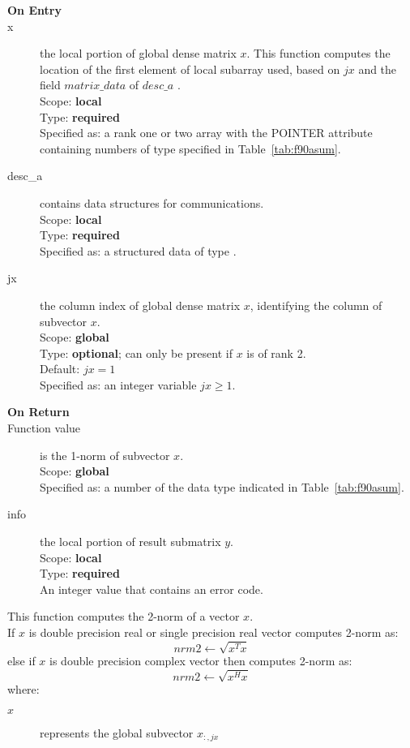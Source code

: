 \begin{description}
\item[\bf On Entry]
\item[x] the local portion of global dense matrix
$x$. This function computes the location of the first element of 
local subarray used, based on $jx$ and the field $matrix\_data$ of $desc\_a$ . \\
Scope: {\bf local} \\
Type: {\bf required} \\
Specified as: a rank one or two array with the POINTER attribute
containing numbers of type specified in
Table~\ref{tab:f90asum}.
\item[desc\_a] contains data structures for communications.\\
Scope: {\bf local} \\
Type: {\bf required}\\
Specified as: a structured data of type \descdata.
\item[jx]  the column index of global dense matrix $x$,
identifying the column of subvector $x$.\\
Scope: {\bf global} \\
Type: {\bf optional}; can only be present if $x$ is of rank 2.\\	
Default: $jx = 1$\\	
Specified as: an integer variable $jx\ge 1$. 

\item[\bf On Return] 
\item[Function value] is the 1-norm of subvector $x$.\\
Scope: {\bf global} \\
Specified as: a number of the data type indicated in Table~\ref{tab:f90asum}.
\item[info] the local portion of result submatrix $y$.\\
Scope: {\bf local} \\
Type: {\bf required} \\
An integer value that contains an error code. 
\end{description}


%
%



This function computes the 2-norm of a vector $x$.\\
If $x$ is double precision real or single precision real vector
computes 2-norm as:
\[ nrm2 \leftarrow \sqrt{x^T x}\]
else if $x$ is double precision complex vector then computes 2-norm  as:
\[ nrm2 \leftarrow \sqrt{x^H x}\]
where:
\begin{description}
\item[$x$] represents the global subvector $x_{:,jx}$
\end{description}

